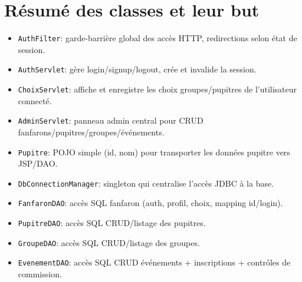 ﻿\documentclass[11pt,a4paper]{article}
\begin{document}
\section{Résumé des classes et leur but}
\begin{itemize}
  \item \texttt{AuthFilter}: garde-barrière global des accès HTTP, redirections selon état de session.
  \item \texttt{AuthServlet}: gère login/signup/logout, crée et invalide la session.
  \item \texttt{ChoixServlet}: affiche et enregistre les choix groupes/pupitres de l'utilisateur connecté.
  \item \texttt{AdminServlet}: panneau admin central pour CRUD fanfarons/pupitres/groupes/événements.
  \item \texttt{Pupitre}: POJO simple (id, nom) pour transporter les données pupitre vers JSP/DAO.
  \item \texttt{DbConnectionManager}: singleton qui centralise l'accès JDBC à la base.
  \item \texttt{FanfaronDAO}: accès SQL fanfaron (auth, profil, choix, mapping id/login).
  \item \texttt{PupitreDAO}: accès SQL CRUD/listage des pupitres.
  \item \texttt{GroupeDAO}: accès SQL CRUD/listage des groupes.
  \item \texttt{EvenementDAO}: accès SQL CRUD événements + inscriptions + contrôles de commission.
\end{itemize}
\end{document}
